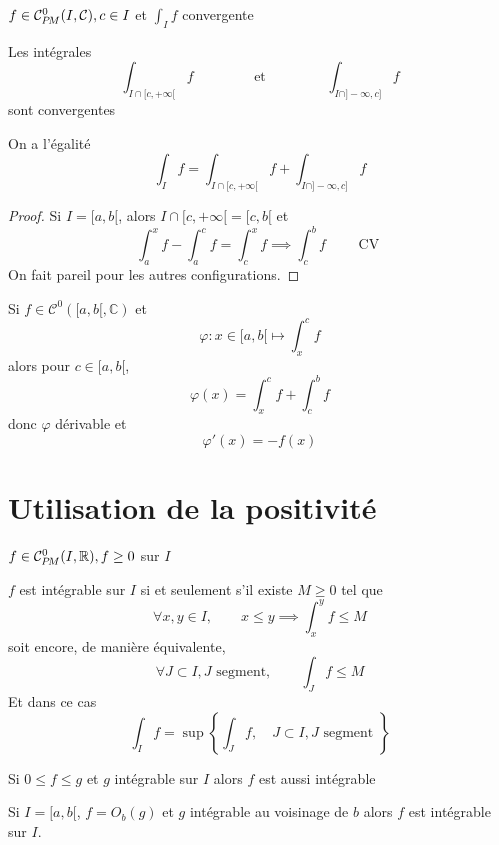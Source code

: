 \needspace{5cm}
\begin{prop}
    \Hyp $f\in\CPM(I, \mathcal C), c\in I$ et $\displaystyle\int_If$ convergente
    \begin{concenum}
        \item Les intégrales \[
                \int_{I\cap [c, +\infty[}f\qquad \qquad \text{ et }\qquad \qquad \int_{I\cap ]-\infty, c]}f
            \]
            sont convergentes
        \item On a l'égalité \[
                \int_If=\int_{I\cap [c, +\infty[}f+\int_{I\cap ]-\infty, c]}f
            \]
    \end{concenum}
\end{prop}

\begin{proof}
    Si $I=[a, b[$, alors $I\cap [c, +\infty[=[c, b[$ et \[
        \int_a^xf-\int_a^cf=\int_c^xf\implies \int_c^bf\qquad \text{ CV }
    \]
    On fait pareil pour les autres configurations.
\end{proof}

\begin{rem}
    Si $f\in \mathcal C^0([a, b[, \mathbb C)$ et \[
        \varphi: x\in [a, b[\longmapsto \int_x^cf
    \]
    alors pour $c\in [a, b[$, \[
        \varphi(x)=\int_x^cf+\int_c^bf
    \]
    donc $\varphi$ dérivable et \[
        \varphi'(x)=-f(x)
    \]
\end{rem}

\section{Utilisation de la positivité}

\begin{prop}
    \Hyp $f\in\CPM(I, \mathbb R), f\geq 0$ sur $I$
    \begin{concenum}
    \item $f$ est intégrable sur $I$ si et seulement s'il existe $M\geq 0$ tel que \[
            \forall x, y\in I, \qquad x\leq y\implies \int_x^yf\leq M
        \]
        soit encore, de manière équivalente, \[
            \forall J\subset I, J\text{ segment},\qquad  \int_Jf\leq M
        \]
        Et dans ce cas \[
            \int_If=\sup \left\{ \int_Jf,\quad J\subset I, J\text{ segment } \right\}
        \]
    \item Si $0\leq f\leq g$ et $g$ intégrable sur $I$ alors $f$ est aussi intégrable
    \item Si $I=[a, b[$, $f=O_b(g)$ et $g$ intégrable au voisinage de $b$ alors $f$ est intégrable sur $I$.
    \end{concenum}
\end{prop}

